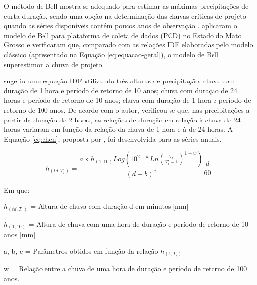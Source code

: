 O método de Bell mostra-se adequado para estimar as máximas precipitações de curta duração, sendo uma opção na determinação das chuvas críticas de projeto quando as séries disponíveis contém poucos anos de observação \cite{goias}.  aplicaram o modelo de Bell para plataforma de coleta de dados (PCD) no Estado do Mato Grosso e verificaram que, comparado com as relações IDF elaboradas pelo modelo clássico (apresentado na Equação \ref{eq:equacao-geral}), o modelo de Bell superestimou a chuva de projeto.

 sugeriu uma equação IDF utilizando três alturas de precipitação: chuva com duração de 1 hora e período de retorno de 10 anos; chuva com duração de 24 horas e período de retorno de 10 anos; chuva com duração de 1 hora e período de retorno de 100 anos. De acordo com o autor, verificou-se que, nas precipitações a partir da duração de 2 horas, as relações de duração em relação à chuva de 24 horas variaram em função da relação da chuva de 1 hora e à de 24 horas. A Equação \ref{eq:chen}, proposta por , foi desenvolvida para as séries anuais.

\begin{equation}
\label{eq:chen}
    h_{(td,T_r)} = \frac{a \times h_{(1,10)} Log(10^{2-w}Ln(\frac{T_r}{T_r-1})^{1-w})}{(d+b)^c} \frac{d}{60}
\end{equation}

Em que:

$h_{(td, T_r)}$ = Altura de chuva com duração d em minutos [mm]

$h_{(1,10)}$ = Altura de chuva com uma hora de duração e período de retorno de 10 anos [mm]

a, b, c = Parâmetros obtidos em função da relação $h_{(1, T_r)}$

w = Relação entre a chuva de uma hora de duração e período de retorno de 100 anos.

